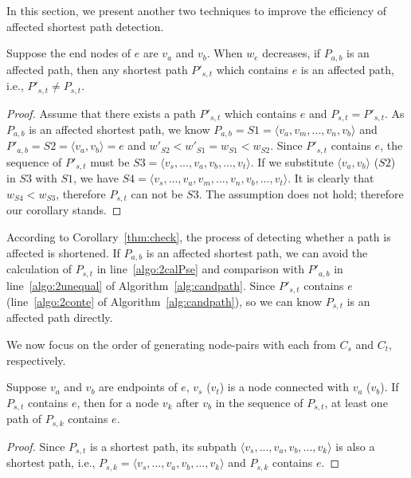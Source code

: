 In this section, we present another two techniques to improve the efficiency of affected shortest path detection.
\begin{corollary}
\label{thm:check}
Suppose the end nodes of $e$ are $v_a$ and $v_b$. When $w_e$ decreases, if $P_{a,b}$ is an affected path, then any shortest path $P'_{s,t}$ which contains $e$ is an affected path, i.e., $P'_{s,t} \neq P_{s,t}$.
\end{corollary}


\begin{proof}
Assume that there exists a path $P'_{s,t}$ which contains $e$ and $P_{s,t}=P'_{s,t}$.
As $P_{a,b}$ is an affected shortest path, we know $P_{a,b}=S1=\langle v_a,v_m,...,v_n,v_b\rangle$ and $P'_{a,b}=S2=\langle v_a,v_b\rangle=e$ and $w'_{S2}<w'_{S1}=w_{S1}<w_{S2}$.
Since $P'_{s,t}$ contains $e$, the sequence of $P'_{s,t}$ must be $S3=\langle v_s,...,v_a,v_b,...,v_t\rangle $. If we substitute $\langle v_a,v_b\rangle$ ($S2$) in $S3$ with $S1$, we have $S4=\langle v_s,...,v_a,v_m,...,v_n,v_b,...,v_t\rangle$. It is clearly that $w_{S4}<w_{S3}$, therefore $P_{s,t}$ can not be $S3$. The assumption does not hold; therefore our corollary stands.
\end{proof}

According to Corollary~\ref{thm:check}, the process of detecting whether a path is affected is shortened. If $P_{a,b}$ is an affected shortest path, we can avoid the calculation of $P_{s,t}$ in line~\ref{algo:2calPse} and comparison with $P'_{a,b}$ in line~\ref{algo:2unequal} of Algorithm~\ref{alg:candpath}.
Since $P'_{s,t}$ contains $e$ (line~\ref{algo:2conte} of Algorithm~\ref{alg:candpath}), so we can know $P_{s,t}$ is an affected path directly.

We now focus on the order of generating node-pairs with each from $C_s$ and $C_t$, respectively.

\begin{corollary}
\label{thm:longer}
Suppose $v_a$ and $v_b$ are endpoints of $e$, $v_s$ ($v_t$) is a node connected with $v_a$ ($v_b$). If $P_{s,t}$ contains $e$, then for a node $v_k$ after $v_b$ in the sequence of $P_{s,t}$, at least one path of $P_{s,k}$ contains $e$.
\end{corollary}

\begin{proof}
Since $P_{s,t}$ is a shortest path, its subpath $\langle v_s,...,v_a,v_b,...,v_k\rangle $ is also a shortest path, i.e., $P_{s,k}=\langle v_s,...,v_a,v_b,...,v_k\rangle$ and $P_{s,k}$ contains $e$.
\end{proof}

